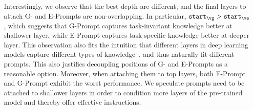 \documentclass[runningheads]{llncs}
\newcommand{\gprompt}{G-Prompt\xspace}
\newcommand{\eprompt}{E-Prompt\xspace}
\def \iep{\texttt{start}_{\ve}}
\def \igp{\texttt{start}_{\vg}}
\begin{document}
Interestingly, we observe that the best depth are different, and the final layers to attach G- and E-Prompts are non-overlapping. In particular, $\igp > \iep$, which suggests that \gprompt captures task-invariant knowledge better at shallower layer, while \eprompt captures task-specific knowledge better at deeper layer. This observation also fits the intuition that different layers in deep learning models capture different types of knowledge~\cite{raghu2021vision,zeiler2014visualizing}, and thus naturally fit different prompts. This also justifies decoupling positions of G- and E-Prompts as a reasonable option. Moreover, %
when attaching them to top layers, both \eprompt and \gprompt exhibit the worst performance. We speculate prompts need to be attached to shallower layers in order to condition more layers of the pre-trained model and thereby offer effective instructions.






\end{document}
